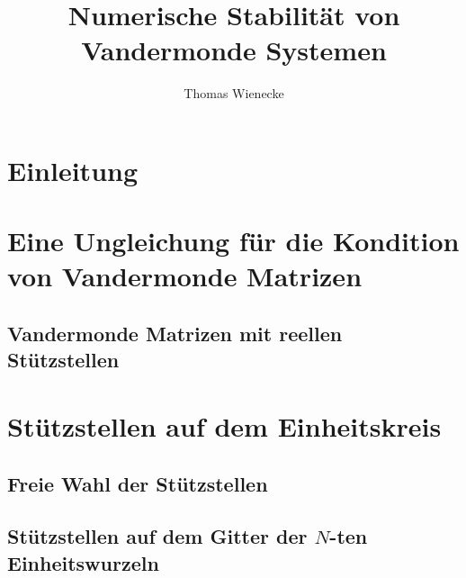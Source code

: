 \documentclass[a4paper, 11pt]{scrreprt}
\title{Numerische Stabilität von Vandermonde Systemen}
\author{Thomas Wienecke}
\begin{document}
\maketitle
\tableofcontents

\chapter{Einleitung}





\chapter{Eine Ungleichung für die Kondition von Vandermonde Matrizen}
\section{Vandermonde Matrizen mit reellen Stützstellen}

\chapter{Stützstellen auf dem Einheitskreis}
\section{Freie Wahl der Stützstellen}
\section{Stützstellen auf dem Gitter der $N$-ten Einheitswurzeln}



\end{document}
